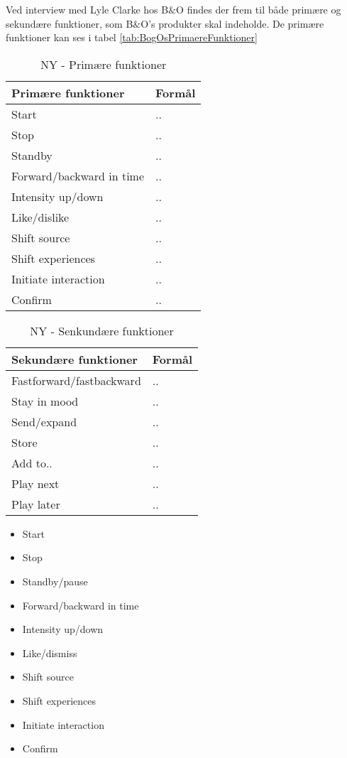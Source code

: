 Ved interview med Lyle Clarke hos B$\&$O findes der frem til både primære og sekundære funktioner, som B$\&$O's produkter skal indeholde. De primære funktioner kan ses i tabel \autoref{tab:BogOsPrimaereFunktioner}

%
\begin{table}[H]
	\centering
	\begin{tabular}{|l|l|}
		\hline
		\multicolumn{1}{|l|}{\textbf{Primære funktioner}} & \multicolumn{1}{l|}{\textbf{Formål}} \\ \hline
		Start & .. \\ \hline
		Stop & .. \\ \hline
		Standby & .. \\ \hline
		Forward/backward in time & .. \\ \hline
		Intensity up/down & .. \\ \hline
		Like/dislike & .. \\ \hline
		Shift source & .. \\ \hline
		Shift experiences & .. \\ \hline
		Initiate interaction & .. \\ \hline
		Confirm & .. \\ \hline
	\end{tabular}
	\caption{NY - Primære funktioner}
	\label{tab:BogOsPrimaereFunktioner}
\end{table}
\noindent
%

%
\begin{table}[H]
	\centering
	\begin{tabular}{|l|l|}
		\hline
		\multicolumn{1}{|l|}{\textbf{Sekundære funktioner}} & \multicolumn{1}{l|}{\textbf{Formål}} \\ \hline
		Fastforward/fastbackward & .. \\ \hline
		Stay in mood & .. \\ \hline
		Send/expand & .. \\ \hline
		Store & .. \\ \hline
		Add to.. & .. \\ \hline
		Play next & .. \\ \hline
		Play later & .. \\ \hline
	\end{tabular}
	\caption{NY - Senkundære funktioner}
	\label{tab:BogOsSekundaereFunktioner}
\end{table}
\noindent
%


\begin{itemize}
	\item Start
	\item Stop
	\item Standby/pause
	\item Forward/backward in time
	\item Intensity up/down
	\item Like/dismiss
	\item Shift source
	\item Shift experiences
	\item Initiate interaction
	\item Confirm
\end{itemize}

